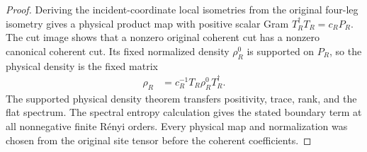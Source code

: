 \begin{proof}\leanok
    Deriving the incident-coordinate local isometries from the original
    four-leg isometry gives a physical product map with positive scalar
    Gram $T_R^\dagger T_R=c_RP_R$. The cut image shows that a
    nonzero original coherent cut has a nonzero canonical coherent cut.
    Its fixed normalized density $\rho_R^0$ is supported on $P_R$, so
    the physical density is the fixed matrix
    \begin{align}
        \rho_R & =c_R^{-1}T_R\rho_R^0T_R^\dagger.
    \end{align}
    The supported physical density theorem transfers positivity, trace,
    rank, and the flat spectrum. The spectral entropy calculation gives
    the stated boundary term at all nonnegative finite Rényi orders.
    Every physical map and normalization was
    chosen from the original site tensor before the coherent coefficients.
\end{proof}

